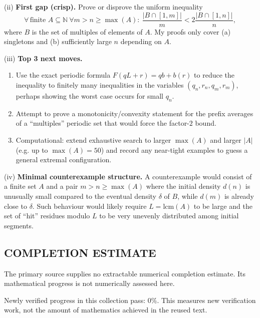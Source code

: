 (ii) \textbf{First gap (crisp).} Prove or disprove the uniform inequality
\[\forall\,\text{finite }A\subseteq\mathbb{N}\ \forall m>n\ge\max(A):\ \frac{|B\cap[1,m]|}{m}<2\frac{|B\cap[1,n]|}{n},\]
where $B$ is the set of multiples of elements of $A$.
My proofs only cover (a) singletons and (b) sufficiently large $n$ depending on $A$.

(iii) \textbf{Top 3 next moves.}
\begin{enumerate}
\item Use the exact periodic formula $F(qL+r)=qb+b(r)$ to reduce the inequality to finitely many inequalities in the variables $(q_n,r_n,q_m,r_m)$, perhaps showing the worst case occurs for small $q_n$.
\item Attempt to prove a monotonicity/convexity statement for the prefix averages of a ``multiples'' periodic set that would force the factor-$2$ bound.
\item Computational: extend exhaustive search to larger $\max(A)$ and larger $|A|$ (e.g. up to $\max(A)=50$) and record any near-tight examples to guess a general extremal configuration.
\end{enumerate}

(iv) \textbf{Minimal counterexample structure.} A counterexample would consist of a finite set $A$ and a pair $m>n\ge\max(A)$ where the initial density $d(n)$ is unusually small compared to the eventual density $\delta$ of $B$, while $d(m)$ is already close to $\delta$. Such behaviour would likely require $L=\mathrm{lcm}(A)$ to be large and the set of ``hit'' residues modulo $L$ to be very unevenly distributed among initial segments.

\bigskip



\subsection*{COMPLETION ESTIMATE}
The primary source supplies no extractable numerical completion estimate. Its mathematical progress is not numerically assessed here.

Newly verified progress in this collection pass: $0\%$. This measures new verification work, not the amount of mathematics achieved in the reused text.
